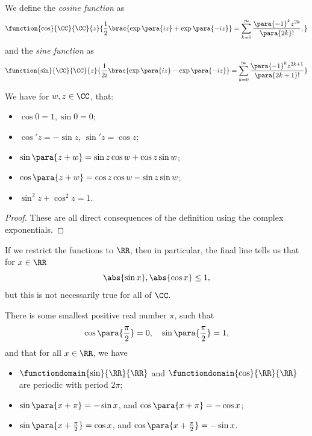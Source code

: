 \begin{definition}
    \label{def:trigonometric-functions}%
    We define the \emph{cosine function} as
    \[
        \function{\cos}{\CC}{\CC}{z}{\frac{1}{2} \brac{\exp \para{iz} + \exp \para{- iz}} = \sum_{k = 0}^{\infty} \frac{\para{-1}^k z^{2k}}{\para{2k}!},}
    \]
    and the \emph{sine function} as
    \[
        \function{\sin}{\CC}{\CC}{z}{\frac{1}{2i} \brac{\exp \para{iz} - \exp \para{- iz}} = \sum_{k = 0}^{\infty} \frac{\para{-1}^k z^{2k + 1}}{\para{2k + 1}!}}
    \]
\end{definition}

\begin{lemma}
    \label{lem:properties-trigonometric-functions}%
    We have for \(w, z \in \CC\), that:
    \begin{itemize}
        \item \(\cos 0 = 1, \sin 0 = 0\);
        \item \(\cos' z = - \sin z\), \(\sin' z = \cos z\);
        \item \(\sin \para{z + w} = \sin z \cos w + \cos z \sin w\);
        \item \(\cos \para{z + w} = \cos z \cos w - \sin z \sin w\);
        \item \(\sin^2 z + \cos^2 z = 1\).
    \end{itemize}
\end{lemma}

\begin{proof}
    These are all direct consequences of the definition using the complex exponentials.
\end{proof}

\begin{remark}
    If we restrict the functions to \(\RR\), then in particular, the final line tells us that for \(x \in \RR\)
    \[
        \abs{\sin x}, \abs{\cos x} \leq 1,
    \]
    but this is not necessarily true for all of \(\CC\).
\end{remark}

\begin{proposition}
    \label{prop:periodicity-trigonometric-functions}%
    There is some smallest positive real number \(\pi\), such that
    \[
        \cos \para{\frac{\pi}{2}} = 0, \quad \sin \para{\frac{\pi}{2}} = 1,
    \]
    and that for all \(x \in \RR\), we have
    \begin{itemize}
        \item \(\functiondomain{\sin}{\RR}{\RR}\) and \(\functiondomain{\cos}{\RR}{\RR}\) are periodic with period \(2 \pi\);
        \item \(\sin \para{x + \pi} = - \sin x\), and \(\cos \para{x + \pi} = - \cos x\);
        \item \(\sin \para{x + \frac{\pi}{2}} = \cos x\), and \(\cos \para{x + \frac{\pi}{2}} = - \sin x\).
    \end{itemize}
\end{proposition}

